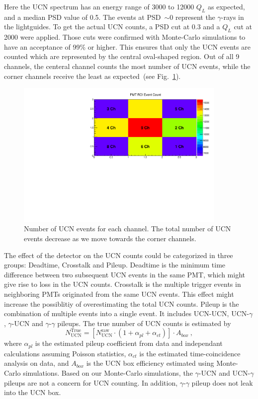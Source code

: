 Here the UCN spectrum has an energy range of 3000 to 12000 $Q_L$ as
expected, and a median PSD value of 0.5. The events at PSD~$\sim 0$
represent the $\gamma$-rays in the lightguides. To get the actual UCN
counts, a PSD cut at 0.3 and a $Q_L$ cut at 2000 were applied.  Those
cuts were confirmed with Monte-Carlo simulations to have an acceptance
of 99\% or higher. This ensures that only the UCN events are counted
which are represented by the central oval-shaped region. Out of all 9
channels, the centeral channel counts the most number of UCN events,
while the corner channels receive the least as expected~(see
Fig.~\ref{fig:channelcounts}).

\begin{figure}[h!]
  \centering
  \includegraphics[width=0.9\textwidth]{channelcounts.pdf}
  \caption{Number of UCN events for each channel. The total number of
    UCN events decrease as we move towards the corner channels.  }
  \label{fig:channelcounts}
\end{figure}


The effect of the detector on the UCN counts could be categorized in
three groups: Deadtime, Crosstalk and Pileup. Deadtime is the minimum
time difference between two subsequent UCN events in the same PMT,
which might give rise to loss in the UCN counts. Crosstalk is the
multiple trigger events in neighboring PMTs originated from the same
UCN events. This effect might increase the possiblitiy of
overestimating the total UCN counts. Pileup is the combination of
multiple events into a single event. It includes UCN-UCN,
UCN-$\gamma$, $\gamma$-UCN and $\gamma$-$\gamma$ pileups. The true
number of UCN counts is estimated by
\begin{equation}
  \label{eqn:trueUCN}
  N^{\mathrm{True}}_{\mathrm{UCN}} = \left [ N^{\mathrm{raw}}_{\mathrm{UCN}} \cdot \left( 1 + \alpha_{pl} + \alpha_{ct}\right) \right] \cdot A_{box}~,
\end{equation}
where $\alpha_{pl}$ is the estimated pileup coefficient from data and
independant calculations assuming Poisson statistics, $\alpha_{ct}$ is
the estimated time-coincidence analysis on data, and $A_{box}$ is the
UCN box efficiency estimated using Monte-Carlo simulations. Based on
our Monte-Carlo simulations, the $\gamma$-UCN and UCN-$\gamma$ pileups
are not a concern for UCN counting. In addition, $\gamma$-$\gamma$
pileup does not leak into the UCN box.

